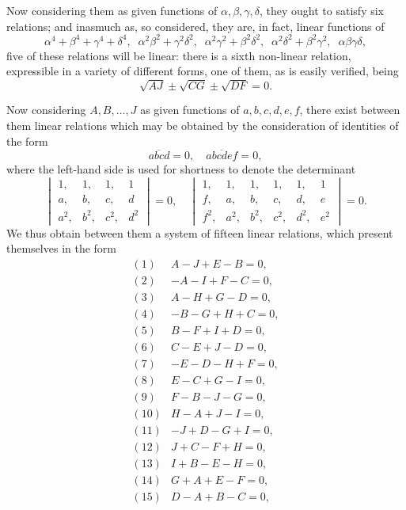 \documentclass[11pt,a4paper]{article}
\begin{document}
\newpage


\noindent Now considering them as given functions of $\alpha, \beta, \gamma, \delta$, they ought to satisfy six relations; and inasmuch as, so considered, they are, in fact, linear functions of
\[
\alpha^{4} + \beta^{4} + \gamma^{4} + \delta^{4},\;\;\alpha^{2}\beta^{2} + \gamma^{2}\delta^{2},\;\;\alpha^{2}\gamma^{2} + \beta^{2}\delta^{2},\;\;\alpha^{2}\delta^{2} + \beta^{2}\gamma^{2},\;\;\alpha\beta\gamma\delta,
\]
five of these relations will be linear: there is a sixth non-linear relation, expressible in a variety of different forms, one of them, as is easily verified, being
\[
\sqrt{AJ} \pm \sqrt{CG} \pm \sqrt{DF} = 0.
\]

Now considering $A, B, \ldots, J$ as given functions of $a, b, c, d, e, f$, there exist between them linear relations which may be obtained by the consideration of identities of the form
\[
\overline{abcd} = 0,\quad \overline{abcdef} = 0,
\]
where the left-hand side is used for shortness to denote the determinant
\[
\begin{vmatrix} 1, & 1, & 1, & 1\\ a, & b, & c, & d\\ a^{2}, & b^{2}, & c^{2}, & d^{2} \end{vmatrix} = 0,\quad
\begin{vmatrix} 1, & 1, & 1, & 1, & 1, & 1\\ f, & a, & b, & c, & d, & e\\ f^{2}, & a^{2}, & b^{2}, & c^{2}, & d^{2}, & e^{2} \end{vmatrix} = 0.
\]
We thus obtain between them a system of fifteen linear relations, which present themselves in the form
\[
\begin{array}{rl}
(1) & A - J + E - B = 0,\\
(2) & -A - I + F - C = 0,\\
(3) & A - H + G - D = 0,\\
(4) & -B - G + H + C = 0,\\
(5) & B - F + I + D = 0,\\
(6) & C - E + J - D = 0,\\
(7) & -E - D - H + F = 0,\\
(8) & E - C + G - I = 0,\\
(9) & F - B - J - G = 0,\\
(10) & H - A + J - I = 0,\\
(11) & -J + D - G + I = 0,\\
(12) & J + C - F + H = 0,\\
(13) & I + B - E - H = 0,\\
(14) & G + A + E - F = 0,\\
(15) & D - A + B - C = 0,
\end{array}
\]
\end{document}
